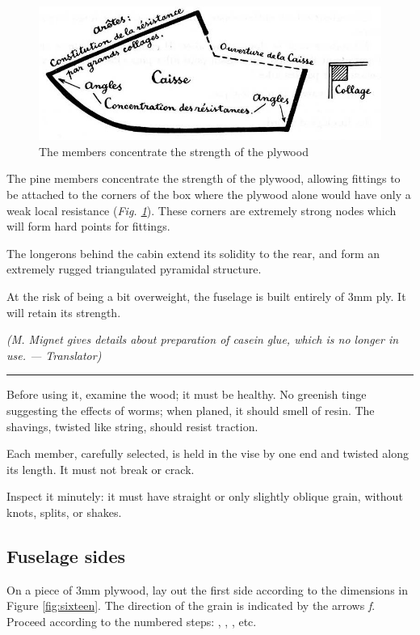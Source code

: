 \documentclass{book}
\newcommand*\circled[1]{\tikz[baseline=(char.base)]{
    \node[shape=circle,draw,inner sep=1pt] (char) {#1};}}
\newcommand*\sectline{
  \vspace{5pt}
  \begin{center}
    \rule{0.5\linewidth}{\linethickness}
  \end{center}
  \vspace{5pt}
}
\begin{document}
\begin{figure}
  \includegraphics[width=\linewidth]{fig-15.jpg}
  \caption{The members concentrate the strength of the plywood}
  \label{fig:fifteen}
\end{figure}

The pine members concentrate the strength of the plywood, allowing
fittings to be attached to the corners of the box where the plywood
alone would have only a weak local resistance
(\textit{Fig. \ref{fig:fifteen}}). These corners are extremely strong nodes which
will form hard points for fittings.

The longerons behind the cabin extend its solidity to the rear, and
form an extremely rugged triangulated pyramidal structure.

At the risk of being a bit overweight, the fuselage is built entirely
of 3mm ply.  It will retain its strength.

\textit{(M. Mignet gives details about preparation of casein glue,
  which is no longer in use. --- Translator)}

\sectline

Before using it, examine the wood; it must be healthy.  No greenish
tinge suggesting the effects of worms; when planed, it should smell of
resin. The shavings, twisted like string, should resist traction.

Each member, carefully selected, is held in the vise by one end and
twisted along its length.  It must not break or crack.

Inspect it minutely: it must have straight or only slightly oblique
grain, without knots, splits, or shakes.

\subsection{Fuselage sides}

On a piece of 3mm plywood, lay out the first side according to the
dimensions in Figure \ref{fig:sixteen}.  The direction of the grain is
indicated by the arrows \textsl{f}.  Proceed according to the numbered
steps: \circled{1}, \circled{2}, \circled{3}, etc.
\end{document}
